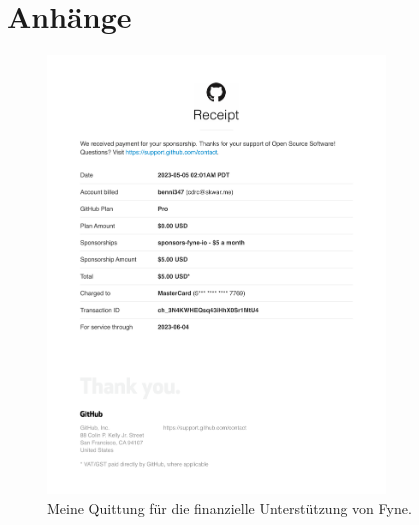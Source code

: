 \section{Anhänge}
\newpage
\begin{figure}[htbp]
  \centering
  \includegraphics[width=0.8\textwidth]{rechnungen/github-benni347-receipt-2023-05-05.pdf}
  \caption{Meine Quittung für die finanzielle Unterstützung von Fyne.}
  \label{fig:fyneio-rechnung}
\end{figure}